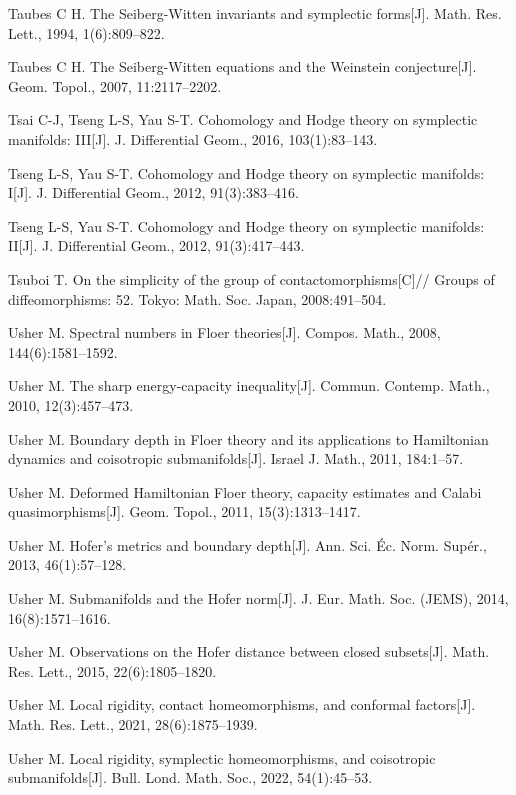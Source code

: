\begin{enumerate}[label={[\arabic*]},leftmargin=3.2em,itemsep=2pt,parsep=0pt]
  \item Taubes C H. The Seiberg-Witten invariants and symplectic forms[J]. Math. Res. Lett.,
        1994, 1(6):809--822.
  \item Taubes C H. The Seiberg-Witten equations and the Weinstein conjecture[J].
        Geom. Topol., 2007, 11:2117--2202.
  \item Tsai C-J, Tseng L-S, Yau S-T. Cohomology and Hodge theory on symplectic manifolds:
        III[J]. J. Differential Geom., 2016, 103(1):83--143.
  \item Tseng L-S, Yau S-T. Cohomology and Hodge theory on symplectic manifolds: I[J].
        J. Differential Geom., 2012, 91(3):383--416.
  \item Tseng L-S, Yau S-T. Cohomology and Hodge theory on symplectic manifolds: II[J].
        J. Differential Geom., 2012, 91(3):417--443.
  \item Tsuboi T. On the simplicity of the group of contactomorphisms[C]// Groups of
        diffeomorphisms: 52. Tokyo: Math. Soc. Japan, 2008:491--504.
  \item Usher M. Spectral numbers in Floer theories[J]. Compos. Math., 2008, 144(6):1581--1592.
  \item Usher M. The sharp energy-capacity inequality[J]. Commun. Contemp. Math., 2010,
        12(3):457--473.
  \item Usher M. Boundary depth in Floer theory and its applications to Hamiltonian dynamics
        and coisotropic submanifolds[J]. Israel J. Math., 2011, 184:1--57.
  \item Usher M. Deformed Hamiltonian Floer theory, capacity estimates and Calabi
        quasimorphisms[J]. Geom. Topol., 2011, 15(3):1313--1417.
  \item Usher M. Hofer's metrics and boundary depth[J]. Ann. Sci. Éc. Norm. Supér., 2013,
        46(1):57--128.
  \item Usher M. Submanifolds and the Hofer norm[J]. J. Eur. Math. Soc. (JEMS), 2014,
        16(8):1571--1616.
  \item Usher M. Observations on the Hofer distance between closed subsets[J]. Math. Res.
        Lett., 2015, 22(6):1805--1820.
  \item Usher M. Local rigidity, contact homeomorphisms, and conformal factors[J]. Math.
        Res. Lett., 2021, 28(6):1875--1939.
  \item Usher M. Local rigidity, symplectic homeomorphisms, and coisotropic submanifolds[J].
        Bull. Lond. Math. Soc., 2022, 54(1):45--53.

\end{enumerate}
